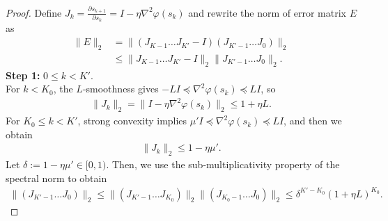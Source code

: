 \documentclass{article}
\begin{document}
\begin{proof}
    Define $J_k = \frac{\partial s_{k+1}}{\partial s_k} = I - \eta \nabla^2 \varphi(s_k)$ and rewrite the norm of error matrix $E$ as 
    \begin{align}\label{eq: trunc E}
        \| E\|_2 &= \|(J_{K-1} \dots J_{K'} - I)(J_{K'-1} \dots J_0) \|_2 \nonumber\\
        &\leq \| J_{K-1} \dots J_{K'} - I \|_2 \| J_{K'-1} \dots J_0\|_2.
    \end{align}
    \textbf{Step 1:} $0 \leq k < K'$. \\
    For $k < K_0$, the $L$-smoothness gives $-L I \preceq \nabla^2 \varphi(s_k) \preceq LI$, so 
    \begin{align*}
        \| J_k \|_2 = \| I - \eta \nabla^2 \varphi(s_k) \|_2 \leq 1 + \eta L.
    \end{align*}
    For $K_0 \leq k <K'$, strong convexity implies $\mu' I \preceq \nabla^2 \varphi (s_k) \preceq L I$, and then we obtain 
    \begin{align*}
       \| J_k \|_2 \leq 1 - \eta \mu'.
    \end{align*}
    Let $\delta := 1 - \eta \mu' \in [0, 1)$.
    Then, we use the sub-multiplicativity property of the spectral norm to obtain
    \begin{align}\label{eq: trunc B1}
        \| (J_{K'-1} \dots J_0)\|_2 \leq \| (J_{K'-1} \dots J_{K_0})\|_2 \| (J_{K_0-1} \dots J_0)\|_2 \leq \delta^{K' - K_0} (1 +\eta L)^{K_0}.
    \end{align}
    

\end{proof}
\end{document}
